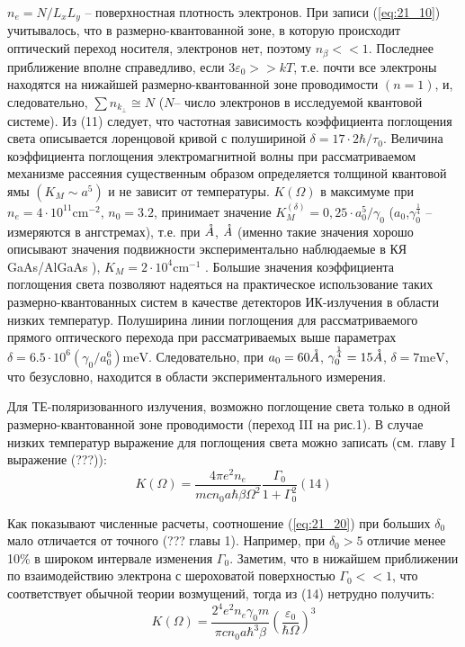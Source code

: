 { $n_{e} =N/L_{x} L_{y} $ – поверхностная плотность электронов. При записи (\ref{eq:21_10}) учитывалось, что в размерно-квантованной зоне, в которую происходит оптический переход носителя, электронов нет, поэтому  $n_{\beta } <<1$. Последнее приближение вполне справедливо, если  $3\varepsilon _{0} >>kT$, т.е. почти все электроны находятся на нижайшей размерно-квантованной зоне проводимости $(n=1)$, и, следовательно,   $\sum n_{k_{\bot } } \cong N$ ($N$– число электронов в исследуемой квантовой системе). Из (11) следует, что частотная зависимость коэффициента поглощения света описывается лоренцовой кривой с полушириной  $\delta =17\cdot 2\hbar /\tau _{0} $. Величина коэффициента поглощения электромагнитной волны при рассматриваемом механизме рассеяния существенным образом определяется толщиной квантовой ямы $\left(K_{M} \sim a^{5} \right)$ и не зависит от температуры. $K\left(\Omega \right)$  в максимуме при $n_{e} =4\cdot 10^{11} \text{cm}^{-2} $, $n_{0} =3.2$,   принимает значение   $K_{M}^{\left(\delta \right)} =0,25\cdot a_{0}^{5} /\gamma _{0} $ ($a_{0} $,$\gamma _{0}^{\frac{1}{4}} $ – измеряются в ангстремах), т.е. при  $\AA$,  $\AA$ (именно такие значения   хорошо описывают значения подвижности   экспериментально наблюдаемые в КЯ GaAs/AlGaAs \cite{West1985}), $K_{M} =2\cdot 10^{4} \text{cm}^{-1} $ . Большие значения коэффициента поглощения света позволяют надеяться на практическое использование таких размерно-квантованных систем в качестве детекторов ИК-излучения в области низких температур. Полуширина линии поглощения для рассматриваемого прямого оптического перехода при рассматриваемых выше параметрах $\delta =6.5\cdot 10^{6} \left(\gamma _{0} /a_{0}^{6} \right)\text{meV}$. Следовательно, при  $a_{0} = 60 \AA$,  $\gamma _{0}^{\frac{1}{4}} = 15 \AA$,  $\delta = 7 \text{meV}$, что безусловно, находится в области экспериментального измерения.

Для ТЕ-поляризованного излучения, возможно поглощение света только в одной размерно-квантованной зоне проводимости (переход III на рис.1). В случае низких температур выражение для поглощения света можно записать (см. главу I выражение (???)):
\begin{equation} \label{eq:21_20}
K(\Omega )=\frac{4\pi e^{2} n_{e} }{mcn_{0} a\hbar \beta \Omega ^{2} } \frac{\Gamma _{0} }{1+\Gamma _{0}^{2} }   (14)
\end{equation} 

Как показывают численные расчеты, соотношение (\ref{eq:21_20}) при больших $\delta $${}_{0}$ мало отличается от точного (??? главы 1). Например, при $\delta_{0} > 5$ отличие менее 10\% в широком интервале изменения $\Gamma_{0}$. Заметим, что в нижайшем приближении по взаимодействию электрона с шероховатой поверхностью $\Gamma_{0}<<1$, что соответствует обычной теории возмущений, тогда из (14) нетрудно получить:
\begin{equation} \label{eq:21_30}
K(\Omega )=\frac{2^{4} e^{2} n_{e} \gamma _{0} m}{\pi cn_{0} a\hbar ^{3} \beta } \left(\frac{\varepsilon _{0} }{\hbar \Omega } \right)^{3}
\end{equation} 

}
